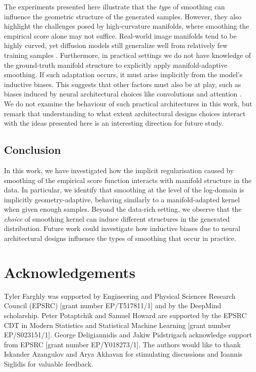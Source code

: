 \documentclass[10pt]{article}
\theoremstyle{plain}
\theoremstyle{definition}
\theoremstyle{remark}
\begin{document}
The experiments presented here illustrate that the \textit{type} of smoothing can influence the geometric structure of the generated samples. 
However, they also highlight the challenges posed by high-curvature manifolds, where smoothing the empirical score alone may not suffice.
Real-world image manifolds tend to be highly curved, yet diffusion models still generalize well from relatively few training samples \citep{kadkhodaie2024generalization}. Furthermore, in practical settings we do not have knowledge of the ground-truth manifold structure to explicitly apply manifold-adaptive smoothing. If such adaptation occurs, it must arise implicitly from the model's inductive biases. This suggests that other factors must also be at play, such as biases induced by neural architectural choices like convolutions and attention \citep{kamb2024_creativity}. We do not examine the behaviour of such practical architectures in this work, but remark that understanding to what extent architectural designs choices interact with the ideas presented here is an interesting direction for future study.
















\subsection{Conclusion}

In this work, we have investigated how the implicit regularisation caused by smoothing of the empirical score function interacts with manifold structure in the data. In particular, we identify that smoothing at the level of the log-domain is implicitly geometry-adaptive, behaving similarly to a manifold-adapted kernel when given enough samples. 
Beyond the data-rich setting, we observe that the \textit{choice} of smoothing kernel can induce different structures in the generated distribution. Future work could investigate how inductive biases due to neural architectural designs influence the types of smoothing that occur in practice.

\section*{Acknowledgements}
Tyler Farghly was supported by Engineering and Physical Sciences Research Council (EPSRC) [grant number EP/T517811/1] and by the DeepMind scholarship.
Peter Potaptchik and Samuel Howard are supported by the EPSRC CDT in Modern Statistics and Statistical Machine Learning [grant number EP/S023151/1].
George Deligiannidis and Jakiw Pidstrigach acknowledge support from EPSRC [grant number EP/Y018273/1]. The authors would like to thank Iskander Azangulov and Arya Akhavan for stimulating discussions and Ioannis Siglidis for valuable feedback.
\end{document}
